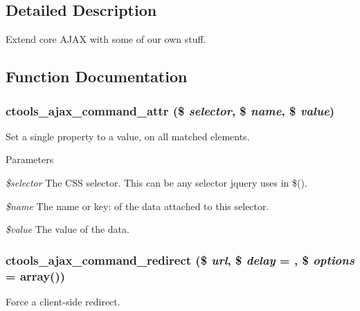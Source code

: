 \subsection{Detailed Description}
Extend core AJAX with some of our own stuff. 

\subsection{Function Documentation}
\hypertarget{profiles_2dosomething_2modules_2contrib_2ctools_2includes_2ajax_8inc_a598e0895893a1295ec95964a2a7e97d8}{
\subsubsection[{ctools\_\-ajax\_\-command\_\-attr}]{\setlength{\rightskip}{0pt plus 5cm}ctools\_\-ajax\_\-command\_\-attr (\$ {\em selector}, \/  \$ {\em name}, \/  \$ {\em value})}}
\label{profiles_2dosomething_2modules_2contrib_2ctools_2includes_2ajax_8inc_a598e0895893a1295ec95964a2a7e97d8}
Set a single property to a value, on all matched elements.


\begin{DoxyParams}{Parameters}
\item[{\em \$selector}]The CSS selector. This can be any selector jquery uses in \$(). \item[{\em \$name}]The name or key: of the data attached to this selector. \item[{\em \$value}]The value of the data. \end{DoxyParams}
\hypertarget{profiles_2dosomething_2modules_2contrib_2ctools_2includes_2ajax_8inc_a5f3e0560404a0fbd02f118c1f7408e24}{
\subsubsection[{ctools\_\-ajax\_\-command\_\-redirect}]{\setlength{\rightskip}{0pt plus 5cm}ctools\_\-ajax\_\-command\_\-redirect (\$ {\em url}, \/  \$ {\em delay} = {}, \/  \$ {\em options} = {\ttfamily array()})}}
\label{profiles_2dosomething_2modules_2contrib_2ctools_2includes_2ajax_8inc_a5f3e0560404a0fbd02f118c1f7408e24}
Force a client-\/side redirect.


